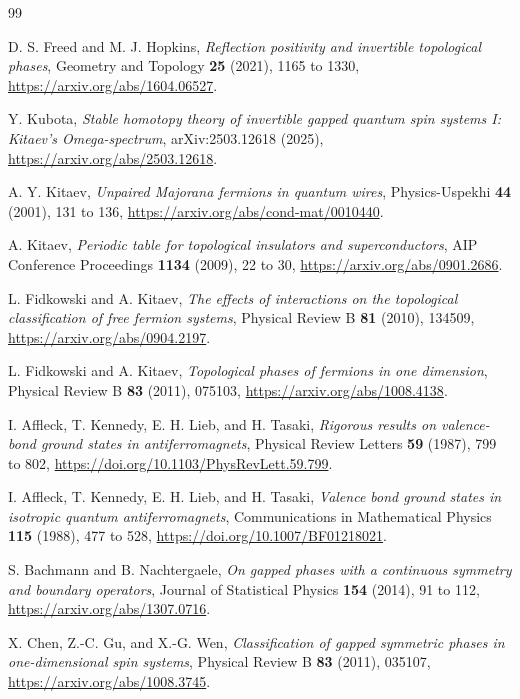 \documentclass[12pt]{article}
\theoremstyle{definition}
\theoremstyle{remark}
\begin{document}
\begin{thebibliography}{99}

D. S. Freed and M. J. Hopkins,
\emph{Reflection positivity and invertible topological phases},
Geometry and Topology \textbf{25} (2021), 1165 to 1330,
\url{https://arxiv.org/abs/1604.06527}.

Y. Kubota,
\emph{Stable homotopy theory of invertible gapped quantum spin systems I:
Kitaev's Omega-spectrum},
arXiv:2503.12618 (2025),
\url{https://arxiv.org/abs/2503.12618}.

A. Y. Kitaev,
\emph{Unpaired Majorana fermions in quantum wires},
Physics-Uspekhi \textbf{44} (2001), 131 to 136,
\url{https://arxiv.org/abs/cond-mat/0010440}.

A. Kitaev,
\emph{Periodic table for topological insulators and superconductors},
AIP Conference Proceedings \textbf{1134} (2009), 22 to 30,
\url{https://arxiv.org/abs/0901.2686}.

L. Fidkowski and A. Kitaev,
\emph{The effects of interactions on the topological classification of free
fermion systems},
Physical Review B \textbf{81} (2010), 134509,
\url{https://arxiv.org/abs/0904.2197}.

L. Fidkowski and A. Kitaev,
\emph{Topological phases of fermions in one dimension},
Physical Review B \textbf{83} (2011), 075103,
\url{https://arxiv.org/abs/1008.4138}.

I. Affleck, T. Kennedy, E. H. Lieb, and H. Tasaki,
\emph{Rigorous results on valence-bond ground states in antiferromagnets},
Physical Review Letters \textbf{59} (1987), 799 to 802,
\url{https://doi.org/10.1103/PhysRevLett.59.799}.

I. Affleck, T. Kennedy, E. H. Lieb, and H. Tasaki,
\emph{Valence bond ground states in isotropic quantum antiferromagnets},
Communications in Mathematical Physics \textbf{115} (1988), 477 to 528,
\url{https://doi.org/10.1007/BF01218021}.

S. Bachmann and B. Nachtergaele,
\emph{On gapped phases with a continuous symmetry and boundary operators},
Journal of Statistical Physics \textbf{154} (2014), 91 to 112,
\url{https://arxiv.org/abs/1307.0716}.

X. Chen, Z.-C. Gu, and X.-G. Wen,
\emph{Classification of gapped symmetric phases in one-dimensional spin
systems},
Physical Review B \textbf{83} (2011), 035107,
\url{https://arxiv.org/abs/1008.3745}.


\end{thebibliography}
\end{document}
